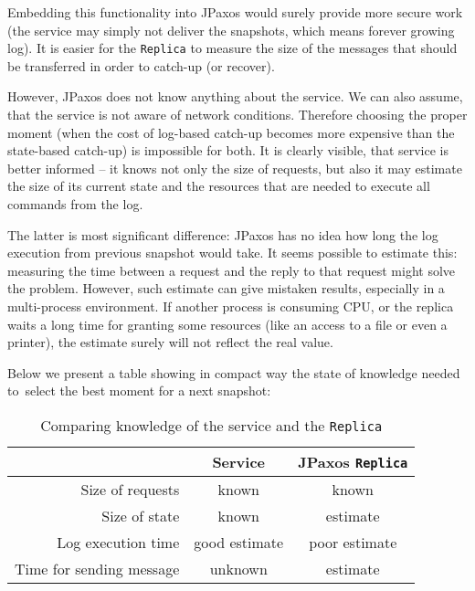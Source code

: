 Embedding this functionality into JPaxos would surely provide more secure work (the service may simply not deliver the snapshots, which means forever growing log). It is easier for the \texttt{Replica} to measure the size of the messages that should be transferred in order to catch-up (or recover).

However, JPaxos does not know anything about the service. We can also assume, that the service is not aware of network conditions. Therefore choosing the proper moment (when the cost of log-based catch-up becomes more expensive than the state-based catch-up) is impossible for both. It is clearly visible, that service is better informed -- it knows not only the size of requests, but also it may estimate the size of its current state and the resources that are needed to execute all commands from the log.

The latter is most significant difference: JPaxos has no idea how long the log execution from previous snapshot would take. It seems possible to estimate this: measuring the time between a request and the reply to that request might solve the problem. However, such estimate can give mistaken results, especially in a multi-process environment. If another process is consuming CPU, or the replica waits a long time for granting some resources (like an access to a file or even a printer), the estimate surely will not reflect the real value.

Below we present a table showing in compact way the state of knowledge needed to~select the best moment for a next snapshot:

\begin{table}[h]
\small \centering
\begin{tabular}{r|c|c|}
\cline{2-3}
 & Service & JPaxos \texttt{Replica} \\ \hline 
\multicolumn{1}{|r|}{Size of requests} & known & known \\ \hline
\multicolumn{1}{|r|}{Size of state } & known & estimate \\ \hline
\multicolumn{1}{|r|}{Log execution time} & good estimate & poor estimate \\ \hline
\multicolumn{1}{|r|}{Time for sending message} & unknown & estimate \\ \hline
\end{tabular}
\caption{Comparing knowledge of the service and the \texttt{Replica}}
\vspace{-1em}
\end{table}

